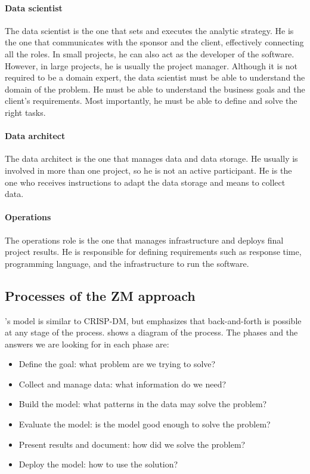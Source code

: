 \paragraph{Data scientist}  The data scientist is the one that sets and executes the
analytic strategy.  He is the one that communicates with the sponsor and the client,
effectively connecting all the roles.  In small projects, he can also act as the developer
of the software.  However, in large projects, he is usually the project manager.
Although it is not required to be a domain expert, the data scientist must be able to
understand the domain of the problem.  He must be able to understand the business goals and
the client's requirements.  Most importantly, he must be able to define and solve the
right tasks.

\paragraph{Data architect}  The data architect is the one that manages data and data storage.
He usually is involved in more than one project, so he is not an active participant.  He
is the one who receives instructions to adapt the data storage and means to collect data.

\paragraph{Operations}  The operations role is the one that manages infrastructure and
deploys final project results.  He is responsible for defining requirements such as response
time, programming language, and the infrastructure to run the software.

\subsection{Processes of the ZM approach}

\citeauthor{Zumel2019}'s model is similar to CRISP-DM, but emphasizes that back-and-forth
is possible at any stage of the process.   shows a diagram of the process.
The phases and the answers we are looking for in each phase are:
\begin{itemize}
  \itemsep0em
  \item Define the goal: what problem are we trying to solve?
  \item Collect and manage data: what information do we need?
  \item Build the model: what patterns in the data may solve the problem?
  \item Evaluate the model: is the model good enough to solve the problem?
  \item Present results and document: how did we solve the problem?
  \item Deploy the model: how to use the solution?
\end{itemize}

